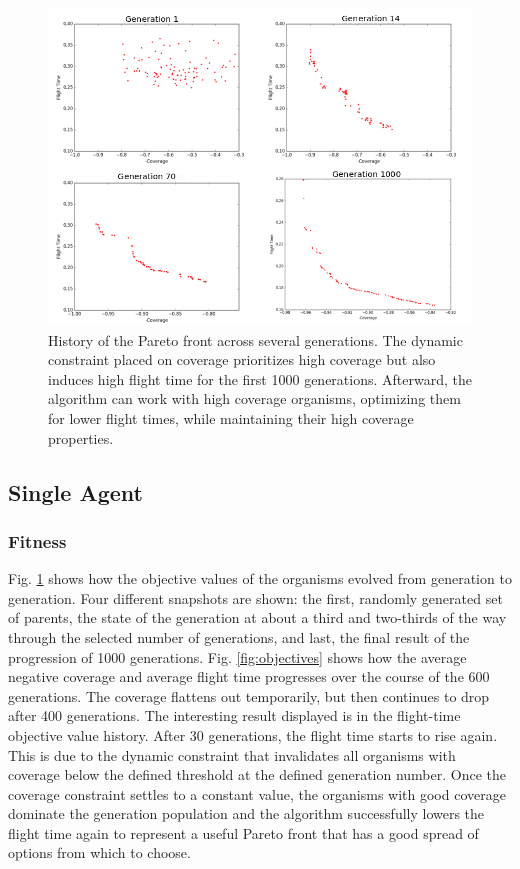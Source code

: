 \documentclass[letterpaper, 10 pt, conference]{ieeeconf}  %
\begin{document}
\begin{table}
\begin{tabular}{l|l}
\end{tabular}
\label{tab:parameters}
\end{table}

\begin{figure}
\centering
\includegraphics[width=0.9\linewidth]{pareto_history3.png}
\caption[A plot of the Pareto front across 1000 generations in the coverage planner optimization.]{History of the Pareto front across several generations. The dynamic constraint placed on coverage prioritizes high coverage but also induces high flight time for the first 1000 generations. Afterward, the algorithm can work with high coverage organisms, optimizing them for lower flight times, while maintaining their high coverage properties.}
\label{fig:pareto_cheetos}
\end{figure}

\subsection{Single Agent}
\subsubsection{Fitness}

Fig. \ref{fig:pareto_cheetos} shows how the objective values of the organisms evolved from generation to generation. Four different snapshots are shown: the first, randomly generated set of parents, the state of the generation at about a third and two-thirds of the way through the selected number of generations, and last, the final result of the progression of 1000 generations. Fig. \ref{fig:objectives} shows how the average negative coverage and average flight time progresses over the course of the 600 generations. The coverage flattens out temporarily, but then continues to drop after 400 generations. The interesting result displayed is in the flight-time objective value history. After 30 generations, the flight time starts to rise again. This is due to the dynamic constraint that invalidates all organisms with coverage below the defined threshold at the defined generation number. Once the coverage constraint settles to a constant value, the organisms with good coverage dominate the generation population and the algorithm successfully lowers the flight time again to represent a useful Pareto front that has a good spread of options from which to choose.
\end{document}

